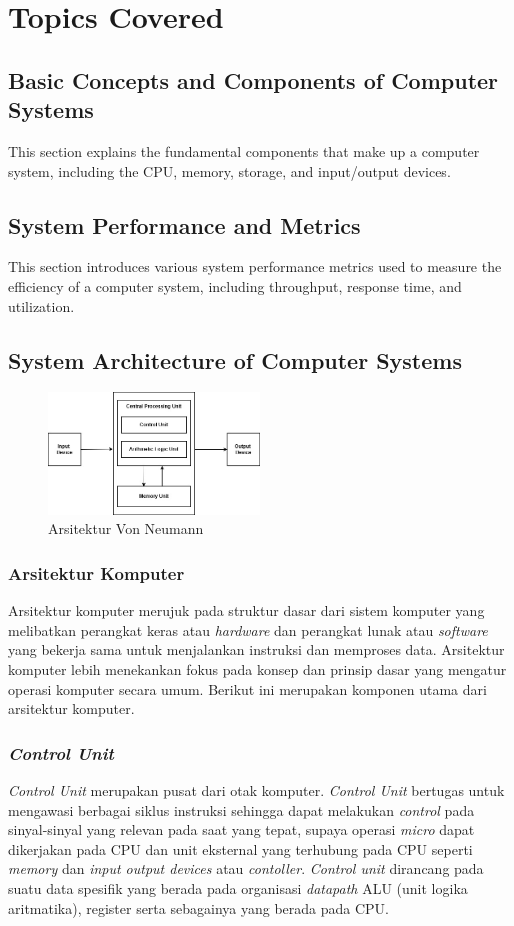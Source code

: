 \documentclass[12pt]{article}
\begin{document}
	\section{Topics Covered}
	
	\subsection{Basic Concepts and Components of Computer Systems}
	This section explains the fundamental components that make up a computer system, including the CPU, memory, storage, and input/output devices.
	
	\subsection{System Performance and Metrics}
	This section introduces various system performance metrics used to measure the efficiency of a computer system, including throughput, response time, and utilization.
	
	\subsection{System Architecture of Computer Systems}
	\begin{figure}[h]
		\centering
		\includegraphics[width=0.5\textwidth]{asset/arsitektur von neumann.jpg}
		\caption{Arsitektur Von Neumann} 
		\label{fig:contoh_gambar} %
	\end{figure}
	\subsubsection{Arsitektur Komputer}
	Arsitektur komputer merujuk pada struktur dasar dari sistem komputer yang melibatkan perangkat keras atau \textit{hardware} dan perangkat lunak atau \textit{software} yang bekerja sama untuk menjalankan instruksi dan memproses data. Arsitektur komputer lebih menekankan fokus pada konsep dan prinsip dasar yang mengatur operasi komputer secara umum. Berikut ini merupakan komponen utama dari arsitektur komputer.
	\subsubsection*{\textit{Control Unit}}
	\textit{Control Unit} merupakan pusat dari otak komputer. \textit{Control Unit} bertugas untuk mengawasi berbagai siklus instruksi sehingga dapat melakukan \textit{control} pada sinyal-sinyal yang relevan pada saat yang tepat, supaya operasi \textit{micro} dapat dikerjakan pada CPU dan unit eksternal yang terhubung pada 
	CPU seperti \textit{memory} dan \textit{input output devices} atau \textit{contoller}.
	\textit{Control unit} dirancang pada suatu data spesifik yang berada pada organisasi \textit{datapath} ALU (unit logika aritmatika), register serta sebagainya yang berada pada CPU.
\end{document}
